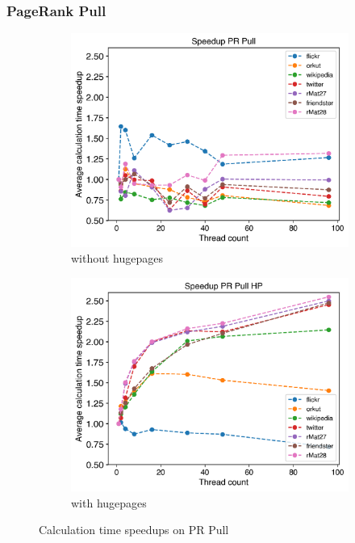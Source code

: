 \subsubsection{PageRank Pull}
\begin{figure}
	\hfil
	\begin{subfigure}{0.4\textwidth}
		\includegraphics[width=\linewidth]{../../plots/singleNodePRPullGaloisThreads.png}
		\caption{without hugepages}
		\label{fig:galoisSpeedupPRPull_noHP}
	\end{subfigure}
	\begin{subfigure}{0.4\textwidth}
		\includegraphics[width=\linewidth]{../../plots/singleNodePRPullGaloisHPThreads.png}
		\caption{with hugepages}
		\label{fig:galoisSpeedupPRPull_HP}
	\end{subfigure}
	\hfil
	\caption{Calculation time speedups on PR Pull}
	\label{fig:galoisSpeedupPRPull}
\end{figure}

